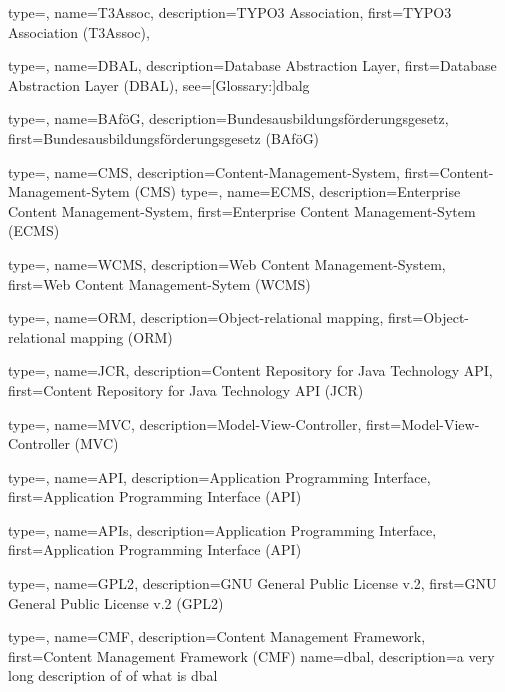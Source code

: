

{
	type=\acronymtype,
	name={T3Assoc},
	description={TYPO3 Association},
	first={TYPO3 Association (T3Assoc)},
}

{
	type=\acronymtype,
	name={DBAL},
	description={Database Abstraction Layer},
	first={Database Abstraction Layer (DBAL)},
	see=[Glossary:]{dbalg}
}

{
	type=\acronymtype,
	name={BAföG},
	description={Bundesausbildungsförderungsgesetz},
	first={Bundesausbildungsförderungsgesetz (BAföG)}
}

{
	type=\acronymtype,
	name={CMS},
	description={Content-Management-System},
	first={Content-Management-Sytem (CMS)}
}
{
	type=\acronymtype,
	name={ECMS},
	description={Enterprise Content Management-System},
	first={Enterprise Content Management-Sytem (ECMS)}
}

{
	type=\acronymtype,
	name={WCMS},
	description={Web Content Management-System},
	first={Web Content Management-Sytem (WCMS)}
}

{
	type=\acronymtype,
	name={ORM},
	description={Object-relational mapping},
	first={Object-relational mapping (ORM)}
}

{
	type=\acronymtype,
	name={JCR},
	description={Content Repository for Java Technology API},
	first={Content Repository for Java Technology API (JCR)}
}

{
	type=\acronymtype,
	name={MVC},
	description={Model-View-Controller},
	first={Model-View-Controller (MVC)}
}

{
	type=\acronymtype,
	name={API},
	description={Application Programming Interface},
	first={Application Programming Interface (API)}
}

{
	type=\acronymtype,
	name={APIs},
	description={Application Programming Interface},
	first={Application Programming Interface (API)}
}

{
	type=\acronymtype,
	name={GPL2},
	description={GNU General Public License v.2},
	first={GNU General Public License v.2 (GPL2)}
}

{
	type=\acronymtype,
	name={CMF},
	description={Content Management Framework},
	first={Content Management Framework (CMF)}
}
{
	name={dbal},
	description={a very long description of of what is dbal}
}
